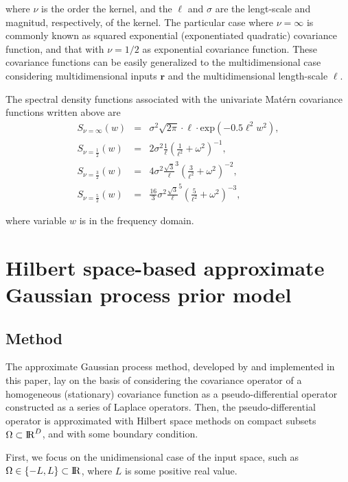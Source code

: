 \documentclass[]{interact}
\theoremstyle{plain}%
\theoremstyle{definition}
\theoremstyle{remark}
\begin{document}
\noindent where $\nu$ is the order the kernel, and the $\ell$ and $\sigma$ are the lengt-scale and magnitud, respectively, of the kernel. The particular case where $\nu=\infty$ is commonly known as squared exponential (exponentiated quadratic) covariance function, and that with $\nu=1/2$ as exponential covariance function. These covariance functions can be easily generalized to the multidimensional case considering multidimensional inputs $\mathbf{r}$ and the multidimensional length-scale $\boldsymbol{\ell}$. 

The spectral density functions associated with the univariate Mat\'ern covariance functions written above are
%
\begin{eqnarray}
S_{\nu=\infty}(w)&=& \sigma^2 \sqrt{2\pi} \cdot \ell \cdot \text{exp}(-0.5 \ell^2 w^2), \nonumber \\
S_{\nu=\frac{1}{2}}(w)&=& 2\sigma^2 \frac{1}{\ell}(\frac{1}{\ell^2} + \omega^2)^{-1}, \nonumber \\
S_{\nu=\frac{3}{2}}(w)&=& 4\sigma^2 \frac{\sqrt{3}}{\ell}^{3}(\frac{3}{\ell^2} + \omega^2)^{-2}, \nonumber \\
S_{\nu=\frac{5}{2}}(w)&=& \frac{16}{3}\sigma^2 \frac{\sqrt{3}}{\ell}^{5}(\frac{5}{\ell^2} + \omega^2)^{-3}, \nonumber 
\end{eqnarray}

\noindent where variable $w$ is in the frequency domain.

\vspace{3mm}
\section{Hilbert space-based approximate Gaussian process prior model}\label{sec:bf_method}

\subsection{Method}

The approximate Gaussian process method, developed by \cite{solin2018hilbert} and implemented in this paper, lay on the basis of considering the covariance operator of a homogeneous (stationary) covariance function as a pseudo-differential operator constructed as a series of Laplace operators. Then, the pseudo-differential operator is approximated with Hilbert space methods on compact subsets $\Omega \subset {\rm I\!R}^D$, and with some boundary condition. 

First, we focus on the unidimensional case of the input space, such as $\Omega \in \{-L,L\} \subset {\rm I\!R}$, where $L$ is some positive real value. 
\end{document}
